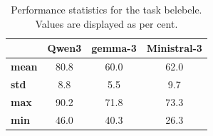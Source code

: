 \setlength{\tabcolsep}{4.5pt}
\begin{table}[ht]
    \centering\footnotesize
    \begin{tabularx}{\columnwidth}%
    {X | c  c c}
        \toprule
         & \textbf{Qwen3} & \textbf{gemma-3} & \textbf{Ministral-3} \\
        \midrule
        \textbf{mean} & 80.8 & 60.0 & 62.0 \\
        \textbf{std} & 8.8 & 5.5 & 9.7 \\
        \textbf{max} & 90.2 & 71.8 & 73.3 \\
        \textbf{min} & 46.0 & 40.3 & 26.3 \\
        \bottomrule
    \end{tabularx}
    \caption{Performance statistics for the task belebele. Values are displayed as per cent.}
    \label{tab:performanceTaskbelebele}
\end{table}
